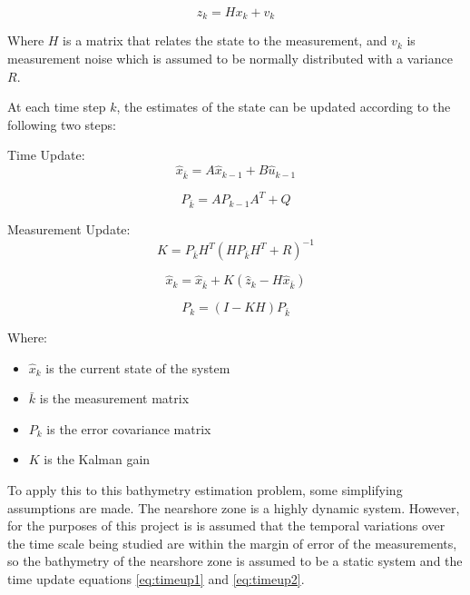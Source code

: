 \begin{equation}
    z_k = Hx_k + v_k
\end{equation}

Where $H$ is a matrix that relates the state to the measurement, and  $v_k$ is measurement noise which is assumed to be normally distributed with a variance $R$.

At each time step $k$, the estimates of the state can be updated according to the following two steps:

Time Update:
\begin{equation}\label{eq:timeup1}
    \hat{x}_{\bar{k}} = A\hat{x}_{k-1} + B\hat{u}_{k-1}
\end{equation}

\begin{equation}\label{eq:timeup2}
    P_{\bar{k}} = A P_{k-1} A^T + Q
\end{equation}

Measurement Update:
\begin{equation}\label{eq:kalmangain}
    K = P_{\bar{k}} H^T(H P_{\bar{k}} H^T + R) ^{-1}
\end{equation}

\begin{equation}\label{eq:new_state_measurement}
    \hat{x}_k = \hat{x}_{\bar{k}} + K(\hat{z}_k - H \hat{x}_{\bar{k}})
\end{equation}

\begin{equation}\label{eq:new_uncertainty}
    P_k = (I - KH)P_{\bar{k}}
\end{equation}

Where:
\begin{itemize}
    \item $\hat{x}_k$ is the current state of the system
    \item $\bar{k}$ is the measurement matrix
    \item $P_k$ is the error covariance matrix
    \item $K$ is the Kalman gain
\end{itemize}

To apply this to this bathymetry estimation problem, some simplifying assumptions are made. The nearshore zone is a highly dynamic system. However, for the purposes of this project is is assumed that the temporal variations over the time scale being studied are within the margin of error of the measurements, so the bathymetry of the nearshore zone is assumed to be a static system and the time update equations \ref{eq:timeup1} and \ref{eq:timeup2}. 

